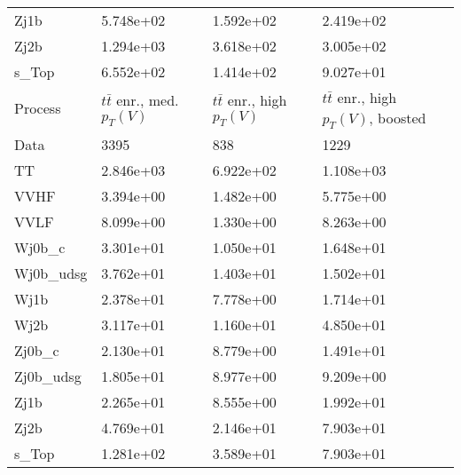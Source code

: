 \begin{table}
{\begin{tabularx}{0.8\textwidth}{|X|X|X|X|}
Zj1b & 5.748e+02 & 1.592e+02 & 2.419e+02 \\
Zj2b & 1.294e+03 & 3.618e+02 & 3.005e+02 \\
s\_Top & 6.552e+02 & 1.414e+02 & 9.027e+01 \\
\hline
\hline
Process & $t\bar{t}$ enr., med. $p_{T}(V)$ & $t\bar{t}$ enr., high $p_{T}(V)$ & $t\bar{t}$ enr., high $p_{T}(V)$, boosted \\
\hline
Data & 3395 & 838 & 1229 \\
\hline
TT & 2.846e+03 & 6.922e+02 & 1.108e+03 \\
VVHF & 3.394e+00 & 1.482e+00 & 5.775e+00 \\
VVLF & 8.099e+00 & 1.330e+00 & 8.263e+00 \\
Wj0b\_c & 3.301e+01 & 1.050e+01 & 1.648e+01 \\
Wj0b\_udsg & 3.762e+01 & 1.403e+01 & 1.502e+01 \\
Wj1b & 2.378e+01 & 7.778e+00 & 1.714e+01 \\
Wj2b & 3.117e+01 & 1.160e+01 & 4.850e+01 \\
Zj0b\_c & 2.130e+01 & 8.779e+00 & 1.491e+01 \\
Zj0b\_udsg & 1.805e+01 & 8.977e+00 & 9.209e+00 \\
Zj1b & 2.265e+01 & 8.555e+00 & 1.992e+01 \\
Zj2b & 4.769e+01 & 2.146e+01 & 7.903e+01 \\
s\_Top & 1.281e+02 & 3.589e+01 & 7.903e+01 \\
\hline
\end{tabularx}
}
\label{tab:cr-Znn-2016}
\end{table}

